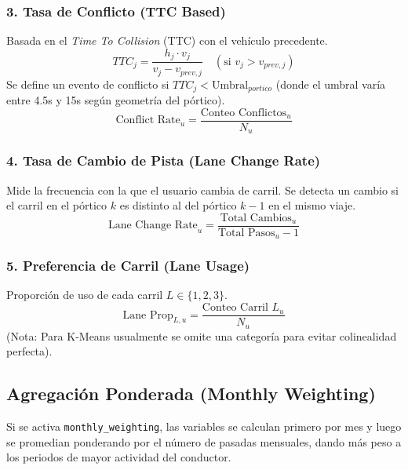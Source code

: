 \documentclass{article}
\begin{document}
\subsubsection{3. Tasa de Conflicto (TTC Based)}
Basada en el \textit{Time To Collision} (TTC) con el vehículo precedente.
\[ TTC_j = \frac{h_j \cdot v_j}{v_j - v_{prev, j}} \quad (\text{si } v_j > v_{prev, j}) \]
Se define un evento de conflicto si $TTC_j < \text{Umbral}_{portico}$ (donde el umbral varía entre 4.5s y 15s según geometría del pórtico).
\[ \text{Conflict Rate}_u = \frac{\text{Conteo Conflictos}_u}{N_u} \]

\subsubsection{4. Tasa de Cambio de Pista (Lane Change Rate)}
Mide la frecuencia con la que el usuario cambia de carril. Se detecta un cambio si el carril en el pórtico $k$ es distinto al del pórtico $k-1$ en el mismo viaje.
\[ \text{Lane Change Rate}_u = \frac{\text{Total Cambios}_u}{\text{Total Pasos}_u - 1} \]

\subsubsection{5. Preferencia de Carril (Lane Usage)}
Proporción de uso de cada carril $L \in \{1, 2, 3\}$.
\[ \text{Lane Prop}_{L, u} = \frac{\text{Conteo Carril } L_u}{N_u} \]
(Nota: Para K-Means usualmente se omite una categoría para evitar colinealidad perfecta).

\subsection{Agregación Ponderada (Monthly Weighting)}
Si se activa \texttt{monthly\_weighting}, las variables se calculan primero por mes y luego se promedian ponderando por el número de pasadas mensuales, dando más peso a los periodos de mayor actividad del conductor.
\end{document}
